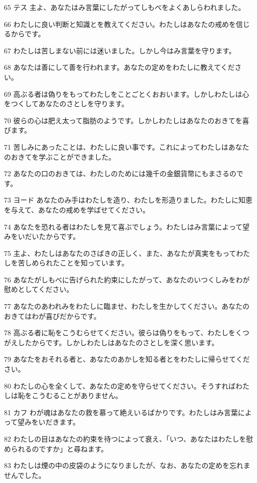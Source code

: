 \par 65 テス 主よ、あなたはみ言葉にしたがってしもべをよくあしらわれました。
\par 66 わたしに良い判断と知識とを教えてください。わたしはあなたの戒めを信じるからです。
\par 67 わたしは苦しまない前には迷いました。しかし今はみ言葉を守ります。
\par 68 あなたは善にして善を行われます。あなたの定めをわたしに教えてください。
\par 69 高ぶる者は偽りをもってわたしをことごとくおおいます。しかしわたしは心をつくしてあなたのさとしを守ります。
\par 70 彼らの心は肥え太って脂肪のようです。しかしわたしはあなたのおきてを喜びます。
\par 71 苦しみにあったことは、わたしに良い事です。これによってわたしはあなたのおきてを学ぶことができました。
\par 72 あなたの口のおきては、わたしのためには幾千の金銀貨幣にもまさるのです。
\par 73 ヨード あなたのみ手はわたしを造り、わたしを形造りました。わたしに知恵を与えて、あなたの戒めを学ばせてください。
\par 74 あなたを恐れる者はわたしを見て喜ぶでしょう。わたしはみ言葉によって望みをいだいたからです。
\par 75 主よ、わたしはあなたのさばきの正しく、また、あなたが真実をもってわたしを苦しめられたことを知っています。
\par 76 あなたがしもべに告げられた約束にしたがって、あなたのいつくしみをわが慰めとしてください。
\par 77 あなたのあわれみをわたしに臨ませ、わたしを生かしてください。あなたのおきてはわが喜びだからです。
\par 78 高ぶる者に恥をこうむらせてください。彼らは偽りをもって、わたしをくつがえしたからです。しかしわたしはあなたのさとしを深く思います。
\par 79 あなたをおそれる者と、あなたのあかしを知る者とをわたしに帰らせてください。
\par 80 わたしの心を全くして、あなたの定めを守らせてください。そうすればわたしは恥をこうむることがありません。
\par 81 カフ わが魂はあなたの救を慕って絶えいるばかりです。わたしはみ言葉によって望みをいだきます。
\par 82 わたしの目はあなたの約束を待つによって衰え、「いつ、あなたはわたしを慰められるのですか」と尋ねます。
\par 83 わたしは煙の中の皮袋のようになりましたが、なお、あなたの定めを忘れませんでした。
